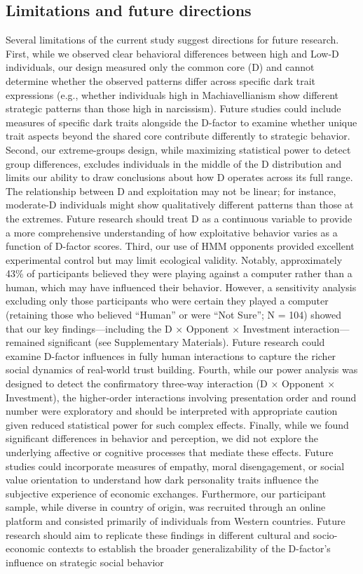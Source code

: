 \documentclass[
]{article}
\begin{document}
\subsection{Limitations and future directions}\label{limitations-and-future-directions}

Several limitations of the current study suggest directions for future research.
First, while we observed clear behavioral differences between high and Low-D individuals, our design measured only the common core (D) and cannot determine whether the observed patterns differ across specific dark trait expressions (e.g., whether individuals high in Machiavellianism show different strategic patterns than those high in narcissism).
Future studies could include measures of specific dark traits alongside the D-factor to examine whether unique trait aspects beyond the shared core contribute differently to strategic behavior.
Second, our extreme-groups design, while maximizing statistical power to detect group differences, excludes individuals in the middle of the D distribution and limits our ability to draw conclusions about how D operates across its full range. The relationship between D and exploitation may not be linear; for instance, moderate-D individuals might show qualitatively different patterns than those at the extremes. Future research should treat D as a continuous variable to provide a more comprehensive understanding of how exploitative behavior varies as a function of D-factor scores.
Third, our use of HMM opponents provided excellent experimental control but may limit ecological validity.
Notably, approximately 43\% of participants believed they were playing against a computer rather than a human, which may have influenced their behavior. However, a sensitivity analysis excluding only those participants who were certain they played a computer (retaining those who believed ``Human'' or were ``Not Sure''; N = 104) showed that our key findings---including the D × Opponent × Investment interaction---remained significant (see Supplementary Materials).
Future research could examine D-factor influences in fully human interactions to capture the richer social dynamics of real-world trust building.
Fourth, while our power analysis was designed to detect the confirmatory three-way interaction (D × Opponent × Investment), the higher-order interactions involving presentation order and round number were exploratory and should be interpreted with appropriate caution given reduced statistical power for such complex effects.
Finally, while we found significant differences in behavior and perception, we did not explore the underlying affective or cognitive processes that mediate these effects.
Future studies could incorporate measures of empathy, moral disengagement, or social value orientation to understand how dark personality traits influence the subjective experience of economic exchanges.
Furthermore, our participant sample, while diverse in country of origin, was recruited through an online platform and consisted primarily of individuals from Western countries.
Future research should aim to replicate these findings in different cultural and socio-economic contexts to establish the broader generalizability of the D-factor's influence on strategic social behavior
\end{document}
